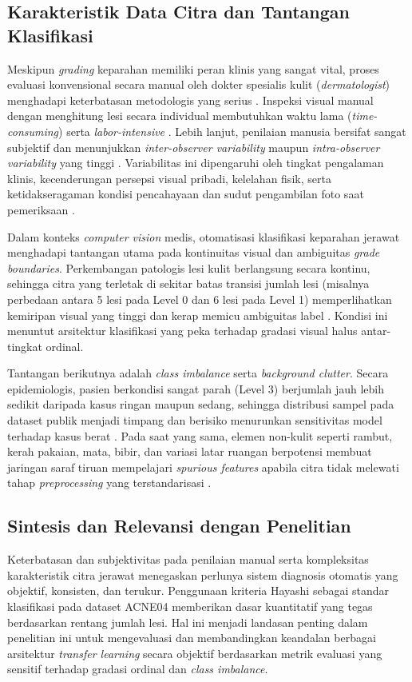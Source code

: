 \subsection{Karakteristik Data Citra dan Tantangan Klasifikasi}
Meskipun \textit{grading} keparahan memiliki peran klinis yang sangat vital, proses evaluasi konvensional secara manual oleh dokter spesialis kulit (\textit{dermatologist}) menghadapi keterbatasan metodologis yang serius \cite{lopez2023, lin2022}. Inspeksi visual manual dengan menghitung lesi secara individual membutuhkan waktu lama (\textit{time-consuming}) serta \textit{labor-intensive} \cite{lopez2023}. Lebih lanjut, penilaian manusia bersifat sangat subjektif dan menunjukkan \textit{inter-observer variability} maupun \textit{intra-observer variability} yang tinggi \cite{lin2022}. Variabilitas ini dipengaruhi oleh tingkat pengalaman klinis, kecenderungan persepsi visual pribadi, kelelahan fisik, serta ketidakseragaman kondisi pencahayaan dan sudut pengambilan foto saat pemeriksaan \cite{lin2022, yu2023}.

Dalam konteks \textit{computer vision} medis, otomatisasi klasifikasi keparahan jerawat menghadapi tantangan utama pada kontinuitas visual dan ambiguitas \textit{grade boundaries}. Perkembangan patologis lesi kulit berlangsung secara kontinu, sehingga citra yang terletak di sekitar batas transisi jumlah lesi (misalnya perbedaan antara 5 lesi pada Level 0 dan 6 lesi pada Level 1) memperlihatkan kemiripan visual yang tinggi dan kerap memicu ambiguitas label \cite{wu2019, watanabe2025}. Kondisi ini menuntut arsitektur klasifikasi yang peka terhadap gradasi visual halus antar-tingkat ordinal.

Tantangan berikutnya adalah \textit{class imbalance} serta \textit{background clutter}. Secara epidemiologis, pasien berkondisi sangat parah (Level 3) berjumlah jauh lebih sedikit daripada kasus ringan maupun sedang, sehingga distribusi sampel pada dataset publik menjadi timpang dan berisiko menurunkan sensitivitas model terhadap kasus berat \cite{lin2022, qu2026}. Pada saat yang sama, elemen non-kulit seperti rambut, kerah pakaian, mata, bibir, dan variasi latar ruangan berpotensi membuat jaringan saraf tiruan mempelajari \textit{spurious features} apabila citra tidak melewati tahap \textit{preprocessing} yang terstandarisasi \cite{lin2022}.

\subsection{Sintesis dan Relevansi dengan Penelitian}
Keterbatasan dan subjektivitas pada penilaian manual serta kompleksitas karakteristik citra jerawat menegaskan perlunya sistem diagnosis otomatis yang objektif, konsisten, dan terukur. Penggunaan kriteria Hayashi sebagai standar klasifikasi pada dataset ACNE04 memberikan dasar kuantitatif yang tegas berdasarkan rentang jumlah lesi. Hal ini menjadi landasan penting dalam penelitian ini untuk mengevaluasi dan membandingkan keandalan berbagai arsitektur \textit{transfer learning} secara objektif berdasarkan metrik evaluasi yang sensitif terhadap gradasi ordinal dan \textit{class imbalance}.

